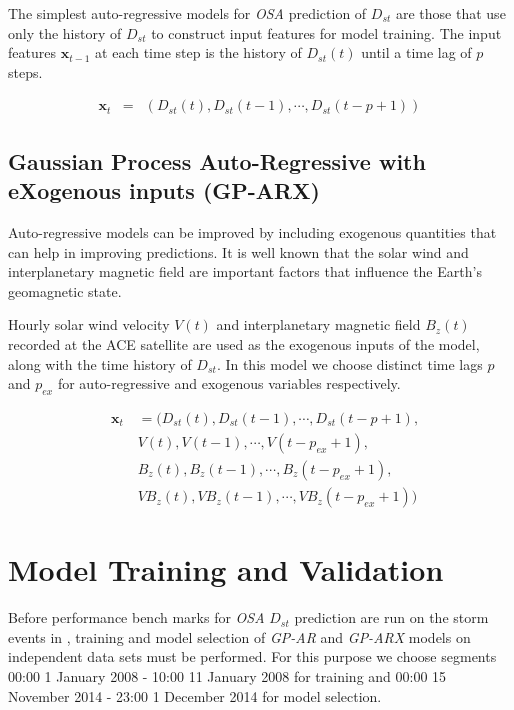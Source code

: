 \documentclass[referee,a4paper,12pt,traditabstract]{swsc}
\begin{document}
\begin{linenumbers}
The simplest auto-regressive models for \emph{OSA} prediction of $D_{st}$ are those that use only the history of $D_{st}$ to construct input features for model training. The input features $\mathbf{x}_{t-1}$ at each time step is the history of $D_{st}(t)$ until a time lag of $p$ steps.

\begin{eqnarray*}
    \mathbf{x}_t & = & \left(D_{st}(t), D_{st}(t-1), \cdots , D_{st}(t-p+1)\right)
\end{eqnarray*}

\subsection{Gaussian Process Auto-Regressive with eXogenous inputs (GP-ARX)} \label{sec:gparx}

Auto-regressive models can be improved by including exogenous quantities that can help in improving predictions. It is well known that the solar wind and interplanetary magnetic field are important factors that influence the Earth's geomagnetic state.

Hourly solar wind velocity $V(t)$ and interplanetary magnetic field $B_z(t)$ recorded at the ACE satellite are used as the exogenous inputs of the model, along with the time history of $D_{st}$. In this model we choose distinct time lags $p$ and $p_{ex}$ for auto-regressive and exogenous variables respectively.
    
\begin{eqnarray*}
        & \mathbf{x}_t & = (D_{st}(t), D_{st}(t-1), \cdots , D_{st}(t-p+1), \\
        & \ \ \ \ \ & V(t), V(t-1), \cdots, V(t-p_{ex}+1),\\
        & \ \ \ \ \ & B_{z}(t), B_{z}(t-1), \cdots, B_{z}(t-p_{ex}+1),\\
        & \ \ \ \ \ & V B_{z}(t), V B_{z}(t-1), \cdots, V B_{z}(t-p_{ex}+1))
\end{eqnarray*}

\section{Model Training and Validation}

Before performance bench marks for \emph{OSA} $D_{st}$ prediction are run on the storm events in \cite{Ji2012}, training and model selection of \emph{GP-AR} and \emph{GP-ARX} models on independent data sets must be performed. For this purpose we choose segments 00:00 1 January 2008 - 10:00 11 January 2008 for training and 00:00 15 November 2014 - 23:00 1 December 2014 for model selection.


\end{linenumbers}
\end{document}
